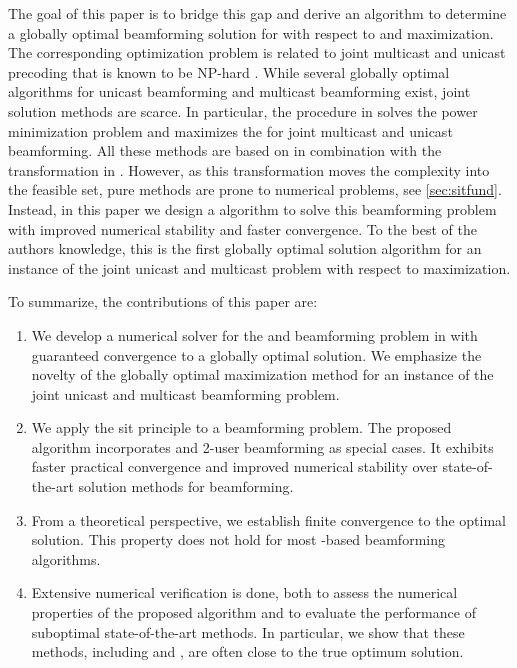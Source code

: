 \documentclass[a4paper,10pt,journal]{IEEEtran}
\begin{document}
The goal of this paper is to bridge this gap and derive an algorithm to determine a globally optimal beamforming solution for  with respect to  and  maximization.
The corresponding optimization problem is related to joint multicast and unicast precoding that is known to be NP-hard \cite{Sidiropoulos2006,Luo2008}. While several globally optimal algorithms for unicast beamforming \cite{Bjornson2013,Tervo2015} and multicast beamforming \cite{Lu2017} exist, joint solution methods are scarce. In particular, the procedure in \cite{Liu2017} solves the power minimization problem and \cite{Chen2018} maximizes the  for joint multicast and unicast beamforming.
All these methods are based on  in combination with the  transformation in \cite{Bengtsson1999}. However, as this transformation moves the complexity into the feasible set, pure  methods are prone to numerical problems, see \cref{sec:sitfund}.
Instead, in this paper we design a   algorithm to solve this beamforming problem with improved numerical stability and faster convergence. To the best of the authors knowledge, this is the first globally optimal solution algorithm for an instance of the joint unicast and multicast problem with respect to  maximization.

To summarize, the contributions of this paper are:
\begin{enumerate}
	\item We develop a numerical solver for the  and  beamforming problem in  with guaranteed convergence to a globally optimal solution. We emphasize the novelty of the globally optimal  maximization method for an instance of the joint unicast and multicast beamforming problem.
	\item We apply the \acrfull{sit} principle to a  beamforming problem. The proposed algorithm incorporates  and  2-user  beamforming as special cases. It exhibits faster practical convergence and improved numerical stability over state-of-the-art solution methods for  beamforming.
	\item From a theoretical perspective, we establish finite convergence to the optimal solution. This property does not hold for most -based beamforming algorithms.
	\item Extensive numerical verification is done, both to assess the numerical properties of the proposed algorithm and to evaluate the performance of suboptimal state-of-the-art methods. In particular, we show that these methods, including  and , are often close to the true optimum solution.
\end{enumerate}
\end{document}
